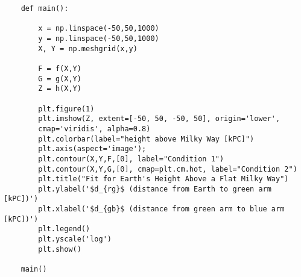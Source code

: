 \documentclass[12pt]{article}
\begin{document}
\begin{lstlisting}
	def main():
	
		x = np.linspace(-50,50,1000)
		y = np.linspace(-50,50,1000)
		X, Y = np.meshgrid(x,y)
		
		F = f(X,Y)
		G = g(X,Y)	
		Z = h(X,Y)
		
		plt.figure(1)
		plt.imshow(Z, extent=[-50, 50, -50, 50], origin='lower',
		cmap='viridis', alpha=0.8)
		plt.colorbar(label="height above Milky Way [kPC]")
		plt.axis(aspect='image');
		plt.contour(X,Y,F,[0], label="Condition 1")
		plt.contour(X,Y,G,[0], cmap=plt.cm.hot, label="Condition 2")
		plt.title("Fit for Earth's Height Above a Flat Milky Way")
		plt.ylabel('$d_{rg}$ (distance from Earth to green arm [kPC])')
		plt.xlabel('$d_{gb}$ (distance from green arm to blue arm [kPC])')
		plt.legend()
		plt.yscale('log')			
		plt.show()

	main()
	\end{lstlisting}
\end{document}
